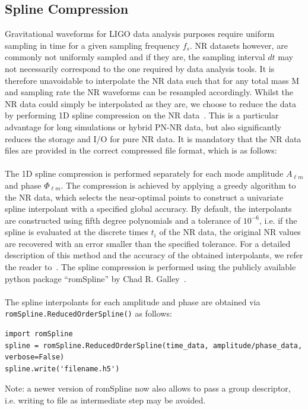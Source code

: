 \documentclass[aps,prd,amssymb,amsmath,amsfonts,superscriptaddress,
floatfix ,preprintnumbers,altaffilletter]{revtex4}
\begin{document}
\subsection{Spline Compression}
\label{sec:spline}
Gravitational waveforms for LIGO data analysis purposes require uniform sampling in time for a given sampling frequency $f_s$.
NR datasets however, are commonly not uniformly sampled and if they are, the sampling interval $dt$ may not necessarily
correspond to the one required by data analysis tools. 
It is therefore unavoidable to interpolate the NR data such that for any total
mass M and sampling rate the NR waveforms can be resampled accordingly. Whilst the NR data could simply be interpolated as
they are, we choose to reduce the data by performing 1D spline compression on the NR data~\cite{Galley:2016aa}. This is a particular advantage for long simulations or hybrid PN-NR data, but also significantly reduces the storage and I/O for pure NR data. It is mandatory that the NR data files are provided in the correct compressed file format, which is as follows: \\
\\The 1D spline compression is performed separately for each mode amplitude $A_{\ell m}$ and phase $\Phi_{\ell m}$. The compression is
achieved by applying a greedy algorithm to the NR data, which selects the near-optimal points to construct a univariate spline interpolant
with a specified global accuracy. By default, the interpolants are constructed using fifth degree polynomials and a tolerance of $10^{-6}$,
i.e. if the spline is evaluated at the discrete times $t_i$ of the NR data, the original NR values are recovered with an error smaller than the
specified tolerance. For a detailed description of this method and the accuracy of the obtained interpolants, we refer the reader to~\cite{Galley:2016aa}. The spline compression is performed using the publicly available python package ``romSpline'' by Chad R. Galley~\cite{romspline}. \\
\\The spline interpolants for each amplitude and phase are obtained via \texttt{romSpline.ReducedOrderSpline()} as follows:
\begin{lstlisting}
import romSpline
spline = romSpline.ReducedOrderSpline(time_data, amplitude/phase_data, verbose=False)
spline.write('filename.h5')
\end{lstlisting}
Note: a newer version of romSpline now also allows to pass a group descriptor, i.e. writing to file as intermediate step may be avoided.
\end{document}

